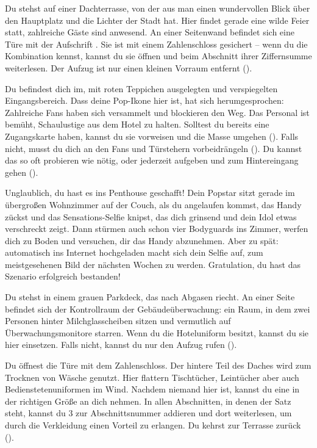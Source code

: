 {	%
	Du stehst auf einer Dachterrasse, von der aus man einen wundervollen Blick über den Hauptplatz und die Lichter der Stadt hat. Hier findet gerade eine wilde Feier statt, zahlreiche Gäste sind anwesend. An einer Seitenwand befindet sich eine Türe mit der Aufschrift . Sie ist mit einem Zahlenschloss gesichert -- wenn du die Kombination kennst, kannst du sie öffnen und beim Abschnitt ihrer Ziffernsumme weiterlesen. Der Aufzug ist nur einen kleinen Vorraum entfernt ().

	Du befindest dich im, mit roten Teppichen ausgelegten und verspiegelten Eingangsbereich. Dass deine Pop-Ikone hier ist, hat sich herumgesprochen: Zahlreiche Fans haben sich versammelt und blockieren den Weg. Das Personal ist bemüht, Schaulustige aus dem Hotel zu halten. Solltest du bereits eine Zugangskarte haben, kannst du sie vorweisen und die Masse umgehen (). Falls nicht, musst du dich an den Fans und Türstehern vorbeidrängeln (). Du kannst das so oft probieren wie nötig, oder jederzeit aufgeben und zum Hintereingang gehen ().

	Unglaublich, du hast es ins Penthouse geschafft! Dein Popstar sitzt gerade im übergroßen Wohnzimmer auf der Couch, als du angelaufen kommst, das Handy zückst und das Sensations-Selfie knipst, das dich grinsend und dein Idol etwas verschreckt zeigt. Dann stürmen auch schon vier Bodyguards ins Zimmer, werfen dich zu Boden und versuchen, dir das Handy abzunehmen. Aber zu spät: automatisch ins Internet hochgeladen macht sich dein Selfie auf, zum meistgesehenen Bild der nächsten Wochen zu werden. Gratulation, du hast das Szenario erfolgreich bestanden!

	Du stehst in einem grauen Parkdeck, das nach Abgasen riecht. An einer Seite befindet sich der Kontrollraum der Gebäudeüberwachung: ein Raum, in dem zwei Personen hinter Milchglasscheiben sitzen und vermutlich auf Überwachungsmonitore starren. Wenn du die Hoteluniform besitzt, kannst du sie hier einsetzen. Falls nicht, kannst du nur den Aufzug rufen ().

	Du öffnest die Türe mit dem Zahlenschloss. Der hintere Teil des Daches wird zum Trocknen von Wäsche genutzt. Hier flattern Tischtücher, Leintücher aber auch Bedienstetenuniformen im Wind. Nachdem niemand hier ist, kannst du eine in der richtigen Größe an dich nehmen. In allen Abschnitten, in denen der Satz  steht, kannst du 3 zur Abschnittsnummer addieren und dort weiterlesen, um durch die Verkleidung einen Vorteil zu erlangen. Du kehrst zur Terrasse zurück ().

}
